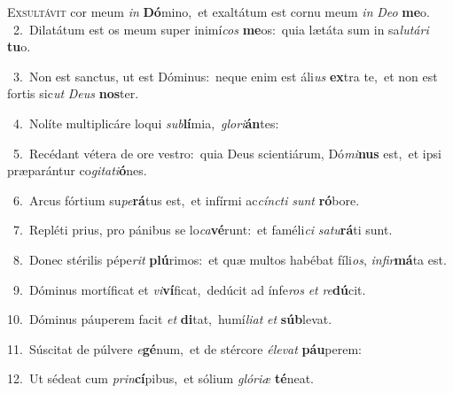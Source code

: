 \lettrine{\initial\textcolor{\initialcolor}{E}}{xsultávit} cor meum \textit{in} \textbf{Dó}\-mino,~\star et exaltátum est cornu meum \textit{in} \textit{De}\-\textit{o} \textbf{me}\-o.\\
{\numbfont\textcolor{\numbcolor}{~2.}}~Dilatátum est os meum super inimí\textit{cos} \textbf{me}\-os:~\star quia lætáta sum in sa\-\textit{lu}\-\textit{tá}\textit{ri} \textbf{tu}\-o.\par
{\numbfont\textcolor{\numbcolor}{~3.}}~Non est sanctus, ut est Dóminus:~\dagger neque enim est áli\textit{us} \textbf{ex}\-tra te,~\star et non est fortis sic\textit{ut} \textit{De}\-\textit{us} \textbf{nos}\-ter.\par
{\numbfont\textcolor{\numbcolor}{~4.}}~Nolíte multiplicáre loqui \textit{sub}\-\textbf{lí}mia,~\star \textit{glo}\-\textit{ri}\textbf{án}tes:\par
{\numbfont\textcolor{\numbcolor}{~5.}}~Recédant vétera de ore vestro:~\dagger quia Deus scientiárum, Dó\-\textit{mi}\-\textbf{nus} est,~\star et ipsi præparántur co\-\textit{gi}\-\textit{ta}\textit{ti}\textbf{ó}nes.\par
{\numbfont\textcolor{\numbcolor}{~6.}}~Arcus fórtium su\-\textit{pe}\-\textbf{rá}tus est,~\star et infírmi ac\-\textit{cínc}\-\textit{ti} \textit{sunt} \textbf{ró}\-bore.\par
{\numbfont\textcolor{\numbcolor}{~7.}}~Repléti prius, pro pánibus se lo\-\textit{ca}\-\textbf{vé}runt:~\star et faméli\textit{ci} \textit{sa}\-\textit{tu}\textbf{rá}ti sunt.\par
{\numbfont\textcolor{\numbcolor}{~8.}}~Donec stérilis pépe\textit{rit} \textbf{plú}\-rimos:~\star et quæ multos habébat fíli\-\textit{os}\-, \textit{in}\-\textit{fir}\textbf{má}ta est.\par
{\numbfont\textcolor{\numbcolor}{~9.}}~Dóminus mortíficat et \textit{vi}\-\textbf{ví}ficat,~\star dedúcit ad ínfe\textit{ros} \textit{et} \textit{re}\-\textbf{dú}cit.\par
{\numbfont\textcolor{\numbcolor}{10.}}~Dóminus páuperem facit \textit{et} \textbf{di}\-tat,~\star humí\-\textit{li}\-\textit{at} \textit{et} \textbf{súb}\-levat.\par
{\numbfont\textcolor{\numbcolor}{11.}}~Súscitat de púlvere \textit{e}\-\textbf{gé}num,~\star et de stércore \textit{é}\-\textit{le}\textit{vat} \textbf{páu}\-perem:\par
{\numbfont\textcolor{\numbcolor}{12.}}~Ut sédeat cum \textit{prin}\-\textbf{cí}pibus,~\star et sólium \textit{gló}\-\textit{ri}\textit{æ} \textbf{té}\-neat.\par
